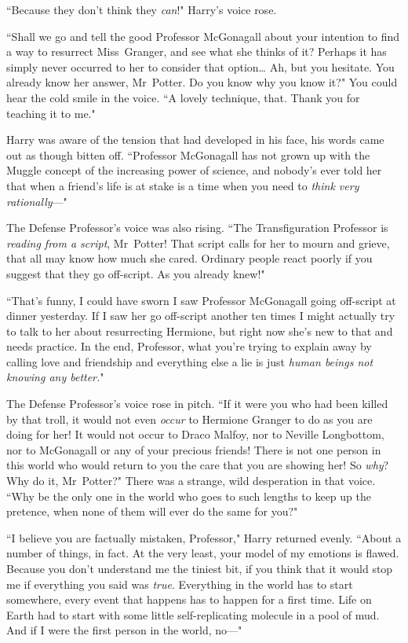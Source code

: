 ``Because they don't think they \emph{can}!" Harry's voice rose.

``Shall we go and tell the good Professor McGonagall about your intention to find a way to resurrect Miss~Granger, and see what she thinks of it? Perhaps it has simply never occurred to her to consider that option{\ldots} Ah, but you hesitate. You already know her answer, Mr~Potter. Do you know why you know it?" You could hear the cold smile in the voice. ``A lovely technique, that. Thank you for teaching it to me."

Harry was aware of the tension that had developed in his face, his words came out as though bitten off. ``Professor McGonagall has not grown up with the Muggle concept of the increasing power of science, and nobody's ever told her that when a friend's life is at stake is a time when you need to \emph{think very rationally}—"

The Defense Professor's voice was also rising. ``The Transfiguration Professor is \emph{reading from a script}, Mr~Potter! That script calls for her to mourn and grieve, that all may know how much she cared. Ordinary people react poorly if you suggest that they go off-script. As you already knew!"

``That's funny, I could have sworn I saw Professor McGonagall going off-script at dinner yesterday. If I saw her go off-script another ten times I might actually try to talk to her about resurrecting Hermione, but right now she's new to that and needs practice. In the end, Professor, what you're trying to explain away by calling love and friendship and everything else a lie is just \emph{human beings not knowing any better.}"

The Defense Professor's voice rose in pitch. ``If it were you who had been killed by that troll, it would not even \emph{occur} to Hermione Granger to do as you are doing for her! It would not occur to Draco Malfoy, nor to Neville Longbottom, nor to McGonagall or any of your precious friends! There is not one person in this world who would return to you the care that you are showing her! So \emph{why}? Why do it, Mr~Potter?" There was a strange, wild desperation in that voice. ``Why be the only one in the world who goes to such lengths to keep up the pretence, when none of them will ever do the same for you?"

``I believe you are factually mistaken, Professor," Harry returned evenly. ``About a number of things, in fact. At the very least, your model of my emotions is flawed. Because you don't understand me the tiniest bit, if you think that it would stop me if everything you said was \emph{true}. Everything in the world has to start somewhere, every event that happens has to happen for a first time. Life on Earth had to start with some little self-replicating molecule in a pool of mud. And if I were the first person in the world, no—"


